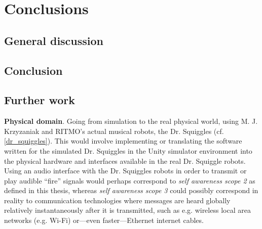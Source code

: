 \chapter{Conclusions} %
\label{chap:conclusions}







\section{General discussion}



\section{Conclusion}



\section{Further work}


\textbf{Physical domain}. Going from simulation to the real physical world, using M. J. Krzyzaniak and RITMO's  actual musical robots, the Dr. Squiggles (cf. \ref{dr_squiggles}). This would involve implementing or translating the software written for the simulated Dr. Squiggles in the Unity simulator environment into the physical hardware and interfaces available in the real Dr. Squiggle robots. Using an audio interface with the Dr. Squiggles robots in order to transmit or play audible ``fire'' signals would perhaps correspond to \textit{self awareness scope 2} as defined in this thesis, whereas \textit{self awareness scope 3} could possibly correspond in reality to communication technologies where messages are heard globally relatively instantaneously after it is transmitted, such as e.g. wireless local area networks (e.g. Wi-Fi) or—even faster—Ethernet internet cables.

